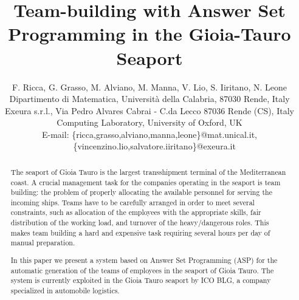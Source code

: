 \documentclass{tlp}
\begin{document}
\def\punto{\hspace*{\fill}{\rule[-0.5mm]{1.5mm}{3mm}}}

\newcommand{\GR}{\ensuremath{Ground(\R)}}
\newcommand{\R}{\ensuremath{r}}
\newcommand{\tneg}{\ensuremath{\neg}}

\newcommand{\p}{\ensuremath{{\cal P}}\xspace}
\newcommand{\GP}{\ensuremath{Ground(\p)}\xspace}
\newcommand{\BP}{\ensuremath{B_{\p}}\xspace}
\newcommand{\UP}{\ensuremath{U_{\p}}\xspace}

\newcommand{\NP}{{\rm NP}\xspace}
\newcommand{\SigmaP}[1]{{\Sigma}_{#1}^{P}}
\newcommand{\CONP}{\textrm{co-NP}\xspace}
\newcommand{\PiP}[1]{{\Pi}_{#1}^{P}}

\newcommand{\iec}[0]{i.e.,\ }
\newcommand{\egc}[0]{e.g.,\ }

\newcommand{\mytt}[1]{{\small\texttt{#1}}\xspace}

\title[Team-building with ASP in Gioia-Tauro Seaport]{Team-building with Answer Set Programming in the Gioia-Tauro Seaport}

\author[F. Ricca et. al]
{ F. Ricca, G. Grasso, M. Alviano, M. Manna, V. Lio, S. Iiritano, N. Leone\\
Dipartimento di Matematica, Universit{\`a} della Calabria, 87030 Rende, Italy\\
Exeura s.r.l., Via Pedro Alvares Cabrai - C.da Lecco 87036 Rende (CS), Italy\\
Computing Laboratory, University of Oxford, UK\\
E-mail: \{ricca,grasso,alviano,manna,leone\}@mat.unical.it, \\
\ \ \,\{vincenzino.lio,salvatore.iiritano\}@exeura.it
}


\pagerange{\pageref{firstpage}--\pageref{lastpage}}
\setcounter{page}{1}


\maketitle

\label{firstpage}


\begin{abstract}
The seaport of Gioia Tauro is the largest transshipment terminal of the Mediterranean coast.
A crucial management task for the companies operating in the seaport is
team building: the problem of properly allocating the available personnel for serving the incoming ships.
Teams have to be carefully arranged in order to meet several constraints, such as
allocation of the employees with the appropriate skills, fair distribution of the working
load, and turnover of the heavy/dangerous roles.
This makes team building a hard and expensive task requiring several hours per day of manual preparation.

In this paper we present a system based on Answer Set Programming (ASP)
for the automatic generation of  the teams of employees in the seaport of Gioia Tauro.
The system is currently exploited in the Gioia Tauro seaport by ICO BLG,
a company specialized in automobile logistics.
\end{abstract}
\end{document}
